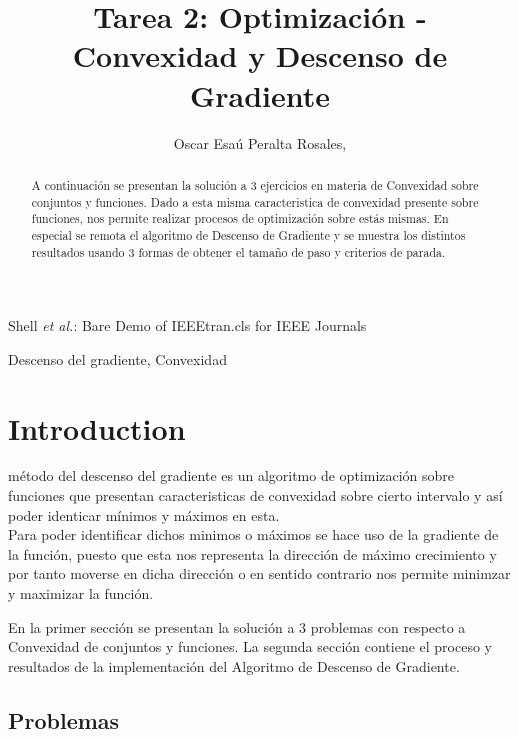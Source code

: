 \documentclass[journal]{IEEEtran}
\begin{document}
\title{Tarea 2: Optimización - Convexidad y Descenso de Gradiente}

\author{Oscar Esaú Peralta Rosales, }

{Shell \MakeLowercase{\textit{et al.}}: Bare Demo of IEEEtran.cls for IEEE Journals}
\maketitle

\begin{abstract}
A continuación se presentan la solución a 3 ejercicios en materia de Convexidad sobre conjuntos y funciones. Dado a esta misma caracteristica de convexidad presente sobre funciones, nos permite realizar procesos de optimización sobre estás mismas. En especial se remota el algoritmo de Descenso de Gradiente y se muestra los distintos resultados usando 3 formas de obtener el tamaño de paso y criterios de parada.
\end{abstract}

\begin{IEEEkeywords}
Descenso del gradiente, Convexidad
\end{IEEEkeywords}


\IEEEpeerreviewmaketitle



\section{Introduction}

 método del descenso del gradiente es un algoritmo de optimización sobre funciones que presentan caracteristicas de convexidad sobre cierto intervalo y así poder identicar mínimos y máximos en esta. \\

Para poder identificar dichos minimos o máximos se hace uso de la gradiente de la función, puesto que esta nos representa la dirección de máximo crecimiento y por tanto moverse en dicha dirección o en sentido contrario nos permite minimzar y maximizar la función.

En la primer sección se presentan la solución a 3 problemas con respecto a Convexidad de conjuntos y funciones. La segunda sección contiene el proceso y resultados de la implementación del Algoritmo de Descenso de Gradiente.

\subsection{Problemas}
\end{document}
